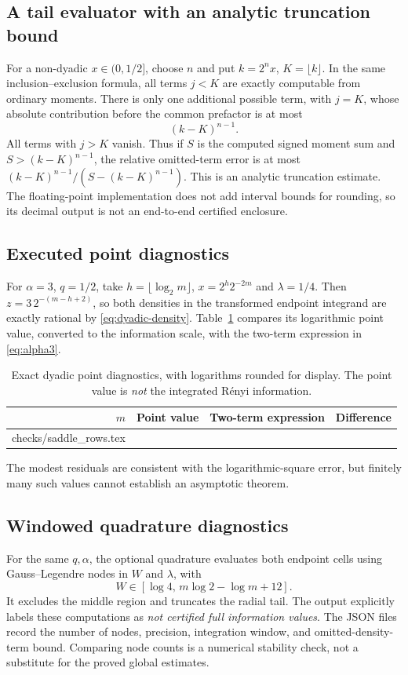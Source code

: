 \documentclass[11pt,a4paper]{article}
\numberwithin{equation}{section}
\theoremstyle{definition}\newaliascnt{definition}{theorem}
\theoremstyle{remark}\newaliascnt{remark}{theorem}
\begin{document}
\subsection{A tail evaluator with an analytic truncation bound}
For a non-dyadic $x\in(0,1/2]$, choose $n$ and put $k=2^nx$,
$K=\lfloor k\rfloor$. In the same inclusion--exclusion formula,
all terms $j<K$ are exactly computable from ordinary moments. There is
only one additional possible term, with $j=K$, whose absolute contribution
before the common prefactor is at most
\begin{equation}
 (k-K)^{n-1}.
 \label{eq:density-remainder}
\end{equation}
All terms with $j>K$ vanish. Thus if $S$ is the computed signed moment sum
and $S>(k-K)^{n-1}$, the relative omitted-term error is at most
$(k-K)^{n-1}/(S-(k-K)^{n-1})$. This is an analytic truncation estimate.
The floating-point implementation does not add interval bounds for rounding,
so its decimal output is not an end-to-end certified enclosure.

\subsection{Executed point diagnostics}
For $\alpha=3$, $q=1/2$, take $h=\lfloor\log_2m\rfloor$,
$x=2^h2^{-2m}$ and $\lambda=1/4$. Then
$z=3\,2^{-(m-h+2)}$, so both densities in the transformed endpoint integrand
are exactly rational by \eqref{eq:dyadic-density}. Table~\ref{tab:saddle}
compares its logarithmic point value, converted to the information scale,
with the two-term expression in \eqref{eq:alpha3}.
\begin{table}[htbp]
\centering\small
\caption{Exact dyadic point diagnostics, with logarithms rounded for display.
The point value is \emph{not} the integrated R\'enyi information.}
\label{tab:saddle}
\begin{tabular}{@{}rrrr@{}}\toprule
$m$&Point value&Two-term expression&Difference\\\midrule
{} checks/saddle_rows.tex 
\bottomrule\end{tabular}
\end{table}
The modest residuals are consistent with the logarithmic-square error,
but finitely many such values cannot establish an asymptotic theorem.

\subsection{Windowed quadrature diagnostics}
For the same $q,\alpha$, the optional quadrature evaluates both endpoint
cells using Gauss--Legendre nodes in $W$ and $\lambda$, with
\[
 W\in[\log4,\,m\log2-\log m+12].
\] It excludes the middle region and truncates the
radial tail. The output explicitly labels these computations as
\emph{not certified full information values}. The JSON files record the
number of nodes, precision, integration window, and omitted-density-term
bound. Comparing node counts is a numerical stability check, not a substitute
for the proved global estimates.
\end{document}

